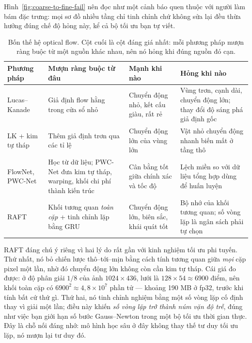 \documentclass[../../../deep_learning.tex]{subfiles}
\begin{document}
Hình~\ref{fig:coarse-to-fine-fail} nên đọc như một cảnh báo quen thuộc với người làm bám đặc trưng: mọi sơ đồ nhiều tầng chỉ tinh chỉnh chứ không sửa lại đều thừa hưởng đúng chế độ hỏng này, kể cả bộ tối ưu bạn tự viết.

\begin{table}[H]\centering\small
\caption{Bốn thế hệ optical flow. Cột cuối là cột đáng giá nhất: mỗi phương pháp mượn ràng buộc từ một nguồn khác nhau, nên nó hỏng khi đúng nguồn đó cạn.}
\label{tab:flow}
\begin{tabularx}{\linewidth}{@{}L{2.0cm}YYL{3.4cm}@{}}
\toprule
\textbf{Phương pháp} & \textbf{Mượn ràng buộc từ đâu} & \textbf{Mạnh khi nào} & \textbf{Hỏng khi nào}\\
\midrule
Lucas--Kanade & Giả định flow hằng trong cửa sổ nhỏ & Chuyển động nhỏ, kết cấu giàu, rất rẻ & Vùng trơn, cạnh dài, chuyển động lớn; thay đổi độ sáng phá giả định gốc\\
LK + kim tự tháp & Thêm giả định trơn qua các tỉ lệ & Chuyển động lớn của vùng lớn & Vật nhỏ chuyển động nhanh biến mất ở tầng thô\\
FlowNet, PWC-Net & Học từ dữ liệu; PWC-Net đưa kim tự tháp, warping, khối chi phí thành kiến trúc \cite{dosovitskiy2015flownet, sun2018pwcnet} & Cân bằng tốt giữa chính xác và tốc độ & Lệch miền so với dữ liệu tổng hợp dùng để huấn luyện\\
RAFT & Khối tương quan \emph{toàn cặp} + tinh chỉnh lặp bằng GRU \cite{teed2020raft} & Chuyển động lớn, biên sắc, khái quát tốt & Bộ nhớ của khối tương quan; số vòng lặp là ngân sách phải tự chọn\\
\bottomrule
\end{tabularx}
\end{table}

RAFT đáng chú ý riêng vì hai lý do rất gần với kinh nghiệm tối ưu phi tuyến. Thứ nhất, nó bỏ chiến lược thô--tới--mịn bằng cách tính tương quan giữa \emph{mọi} cặp pixel một lần, nhờ đó chuyển động lớn không còn cần kim tự tháp. Cái giá đo được: ở độ phân giải \(1/8\) của ảnh \(1024\times436\), lưới là \(128\times54 \approx 6900\) điểm, nên khối toàn cặp có \(6900^2 \approx 4{,}8\times10^7\) phần tử --- khoảng 190 MB ở fp32, trước khi tính bất cứ thứ gì. Thứ hai, nó tinh chỉnh nghiệm bằng một số vòng lặp cố định thay vì giải một lần; điều này khiến \emph{số vòng lặp trở thành núm vặn độ trễ}, đúng như việc bạn giới hạn số bước Gauss--Newton trong một bộ tối ưu thời gian thực. Đây là chỗ nối đáng nhớ: mô hình học sâu ở đây không thay thế tư duy tối ưu lặp, nó mượn lại tư duy đó.
\end{document}
